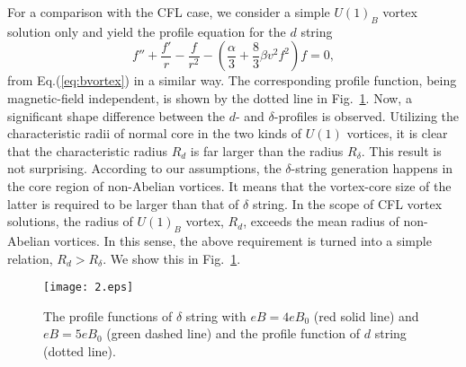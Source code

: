 \documentclass[12pt]{article}
\begin{document}
For a comparison with the CFL case, we consider a simple $U(1)_B$ vortex solution only and yield the
profile equation for the $d$ string
\begin{equation}
  \label{eq:bvortexprofile}
  f'' + \frac{f'}{r} -\frac{f}{r^2} - (\frac{\alpha}{3} + \frac{8}{3}\beta v^2 f^2)f=0,
\end{equation}
from Eq.(\ref{eq:bvortex}) in a similar way.
The corresponding profile function, being magnetic-field independent, is shown by the dotted line in
Fig.~\ref{fig:2}. Now, a significant shape difference between the $d$- and $\delta$-profiles is observed.
Utilizing the characteristic radii of normal core in the two kinds of $U(1)$ vortices, it is clear that
the characteristic radius $R_d$ is far larger than the radius $R_\delta$.
This result is not surprising. According to our assumptions, the $\delta$-string generation happens in
the core region of non-Abelian vortices. It means that the vortex-core size of the latter is required
to be larger than that of $\delta$ string. In the scope of CFL vortex solutions, the radius of $U(1)_B$ vortex, $R_d$, exceeds the mean radius of non-Abelian vortices. In this sense, the
above requirement is turned into a simple relation, $R_d > R_\delta$. We show this in Fig.~\ref{fig:2}.

\begin{figure}
	\texttt{[image: 2.eps]}
	\caption{The profile functions of $\delta$ string with $eB = 4eB_0$ (red solid line) and
    $eB = 5 eB_0$ (green dashed line) and the profile function of $d$ string (dotted line).}
	\label{fig:2}
\end{figure}
\end{document}

